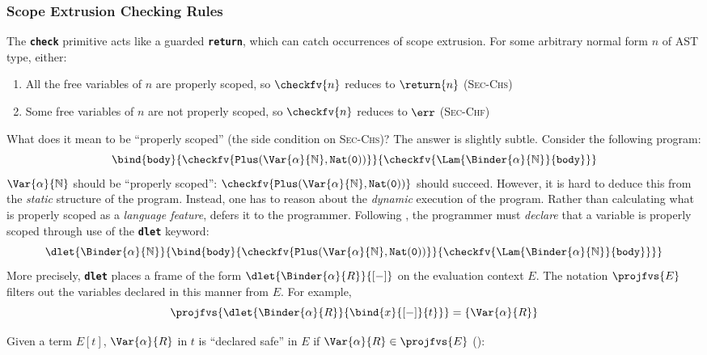 
\subsubsection{Scope Extrusion Checking Rules}
The \textbf{\texttt{check}} primitive acts like a guarded \textbf{\texttt{return}}, which can catch occurrences of scope extrusion. For some arbitrary normal form $n$ of AST type, either:
\begin{enumerate}
  \item All the free variables of $n$ are properly scoped, so $\checkfv{n}$ reduces to $\return{n}$ (\textsc{Sec-Chs})
  \item Some free variables of $n$ are not properly scoped, so $\checkfv{n}$ reduces to $\err$ (\textsc{Sec-Chf})
\end{enumerate}
What does it mean to be ``properly scoped'' (the side condition on \textsc{Sec-Chs})? The answer is slightly subtle. Consider the following program: 
\[\bind{\texttt{body}}{\checkfv{\texttt{Plus}(\Var{\alpha}{\mathbb{N}}, \texttt{Nat}(\texttt{0}))}}{\checkfv{\Lam{\Binder{\alpha}{\mathbb{N}}}{\texttt{body}}}}\]
$\Var{\alpha}{\mathbb{N}}$ should be ``properly scoped'': $\checkfv{\texttt{Plus}(\Var{\alpha}{\mathbb{N}}, \texttt{Nat}(\texttt{0}))}$ should succeed. However, it is hard to deduce this from the \textit{static} structure of the program. Instead, one has to reason about the \textit{dynamic} execution of the program. Rather than calculating what is properly scoped as a \textit{language feature}, \coreLang{} defers it to the programmer. Following \citet{kiselyov-2024}, the programmer must \textit{declare} that a variable is properly scoped through use of the \textbf{\texttt{dlet}} keyword: 
\[\dlet{\Binder{\alpha}{\mathbb{N}}}{\bind{\texttt{body}}{\checkfv{\texttt{Plus}(\Var{\alpha}{\mathbb{N}}, \texttt{Nat}(\texttt{0}))}}{\checkfv{\Lam{\Binder{\alpha}{\mathbb{N}}}{\texttt{body}}}}}\]
More precisely, \textbf{\texttt{dlet}} places a frame of the form $\dlet{\Binder{\alpha}{R}}{[-]}$ on the evaluation context $E$. The notation $\projfvs{E}$ filters out the variables declared in this manner from $E$. For example,
\[\projfvs{\dlet{\Binder{\alpha}{R}}{\bind{x}{[-]}{t}}} = \{ \Var{\alpha}{R} \}\]

Given a term $E[t]$, $\Var{\alpha}{R}$ in $t$ is ``declared safe'' in $E$ if $\Var{\alpha}{R} \in \projfvs{E}$ ():

